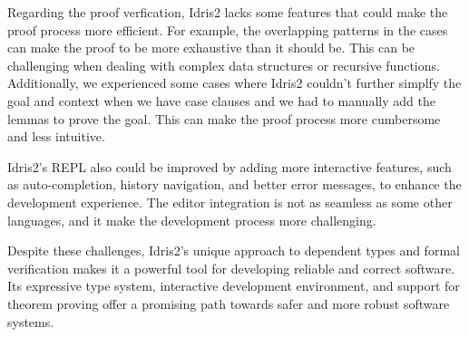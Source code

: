 \documentclass[]{rptuseminar}
\begin{document}
Regarding the proof verfication, Idris2 lacks some features that could make the proof process more efficient. For example, the overlapping patterns in the cases can make the proof to be more exhaustive than it should be. This can be challenging when dealing with complex data structures or recursive functions. Additionally, we experienced some cases where Idris2 couldn't further simplfy the goal and context when we have case clauses and we had to manually add the lemmas to prove the goal. This can make the proof process more cumbersome and less intuitive.

Idris2's REPL also could be improved by adding more interactive features, such as auto-completion, history navigation, and better error messages, to enhance the development experience. The editor integration is not as seamless as some other languages, and it make the development process more challenging.

Despite these challenges, Idris2's unique approach to dependent types and formal verification makes it a powerful tool for developing reliable and correct software. Its expressive type system, interactive development environment, and support for theorem proving offer a promising path towards safer and more robust software systems.


\newpage
\nocite{*}



\end{document}
